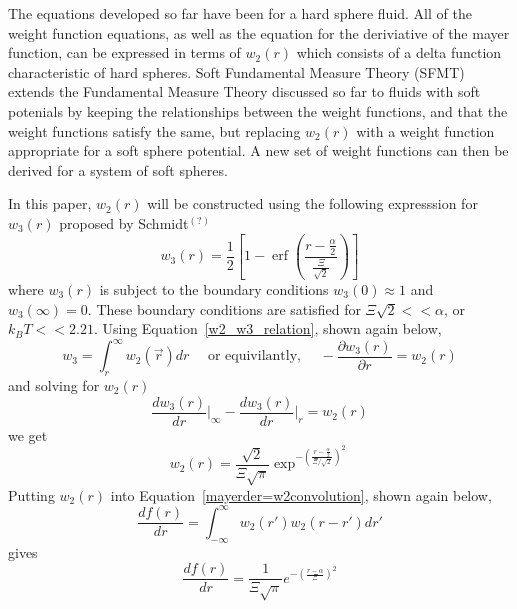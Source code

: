 \documentclass[12pt]{article}
\begin{document}
The equations developed so far have been for a hard sphere fluid. All of the weight function equations, as well as the equation for the deriviative of the mayer function, can be expressed in terms of $w_{2}(r)$ which consists of a delta function characteristic of hard spheres. Soft Fundamental Measure Theory (SFMT) extends the Fundamental Measure Theory discussed so far to fluids with soft potenials by keeping the relationships between the weight functions, and that the weight functions satisfy the same, but replacing $w_{2}(r)$ with a weight function appropriate for a soft sphere potential. A new set of weight functions can then be derived for a system of soft spheres. 

In this paper,  $w_{2}(r)$ will be constructed using the following expresssion for $w_3(r)$ proposed by Schmidt$^{(?)}$ 
\begin{equation}{w_3(r)=\frac{1}{2}}\left[1-\operatorname{erf}\left(\frac{r-\frac{\alpha}{2}}{\frac{\Xi}{\sqrt{2}}}\right)\right]\end{equation} 
 where $w_3(r)$ is subject to the boundary conditions $w_3(0)\approx{1}$ and $w_3(\infty)=0$. 
\color{red}These boundary conditions are satisfied for $\Xi{\sqrt{2}<<\alpha}$, or $k_BT << 2.21$. \color{black} 
Using Equation~\ref{w2_w3_relation}, shown again below, 
\begin{displaymath}{w_{3}=\int_{r}^{\infty}{w_{2}(\vec{r})dr}\mbox{~~~~or equivilantly,~~~~}-\frac{\partial{w_3(r)}}{\partial{r}}=w_2(r)}\end{displaymath}
and solving for $w_2(r)$
\begin{displaymath}{\frac{dw_3(r)}{dr}\bigg|_{\infty}-\frac{dw_3(r)}{dr}\bigg|_{r}=w_2(r)}\end{displaymath} 
we get \begin{equation}{ w_2(r)=\frac{\sqrt{2}}{\Xi\sqrt\pi}\exp^{-\left(\frac{r-\frac{\alpha}{2}}{\Xi/\sqrt{2}}\right)^2} }\end{equation} %
Putting $w_2(r)$ into Equation~\ref{mayerder=w2convolution}, shown again below, 
\begin{displaymath}{\frac{df(r)}{dr}=\int_{-\infty}^{\infty}{w_2(r')w_2(r-r')dr'}}\end{displaymath}
gives
\begin{equation}{\frac{df(r)}{dr}=\frac{1}{\Xi\sqrt{\pi}}e^{-\left(\frac{r-\alpha}{\Xi}\right)^2}}\end{equation} 
\end{document}
